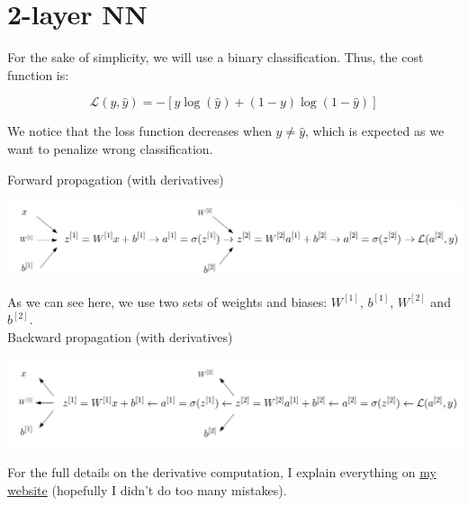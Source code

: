 \section{2-layer NN}

For the sake of simplicity, we will use a binary classification. Thus, the cost function is:

$$\mathcal{L}(y, \widehat{y})=-[y\log(\widehat{y})+(1-y)\log(1-\widehat{y})]$$

We notice that the loss function decreases when $y \neq \widehat y$, which is expected as we want to penalize wrong classification.

Forward propagation (with derivatives)

\begin{center}
\includegraphics[scale=0.3]{img/NN_2.png}
\end{center}

As we can see here, we use two sets of weights and biases: $W^{[1]}$, $b^{[1]}$, $W^{[2]}$ and $b^{[2]}$. \\

Backward propagation (with derivatives)

\begin{center}
\includegraphics[scale=0.3]{img/NN_2_backward.png}
\end{center}

For the full details on the derivative computation, I explain everything on \href{https://github.savoga.io}{my website} (hopefully I didn't do too many mistakes).